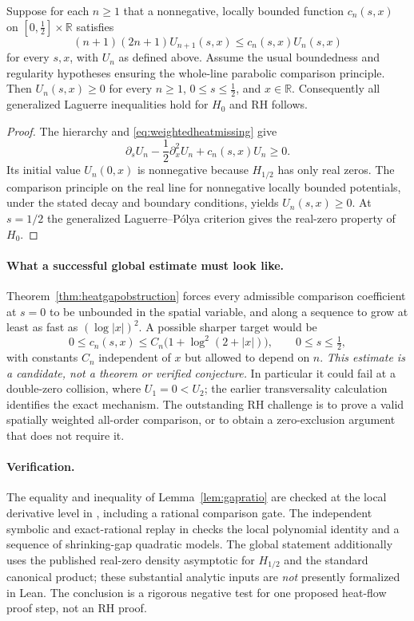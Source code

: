 \begin{proposition}
\label{prop:weightedheatsufficient}
Suppose for each $n\ge1$ that a
nonnegative, locally bounded function
$c_n(s,x)$ on $[0,\tfrac12]\times\mathbb R$
satisfies
\begin{equation}
(n+1)(2n+1)U_{n+1}(s,x)
\le c_n(s,x)U_n(s,x)
\label{eq:weightedheatmissing}
\end{equation}
for every $s,x$, with $U_n$ as
defined above. Assume the usual
boundedness and regularity hypotheses
ensuring the whole-line parabolic
comparison principle. Then
$U_n(s,x)\ge0$ for every
$n\ge1$, $0\le s\le\tfrac12$,
and $x\in\mathbb R$.
Consequently all generalized
Laguerre inequalities hold for
$H_0$ and RH follows.
\end{proposition}
\begin{proof}
The hierarchy and
\eqref{eq:weightedheatmissing} give
\[
\partial_s U_n-\frac12\partial_x^2U_n
+c_n(s,x)U_n\ge0.
\]
Its initial value $U_n(0,x)$ is
nonnegative because $H_{1/2}$ has
only real zeros. The comparison
principle on the real line for
nonnegative locally bounded potentials,
under the stated decay and boundary
conditions, yields $U_n(s,x)\ge0$.
At $s=1/2$ the generalized
Laguerre--P\'olya criterion gives
the real-zero property of $H_0$.
\end{proof}

\paragraph{What a successful global estimate must look like.}
Theorem~\ref{thm:heatgapobstruction}
forces every admissible comparison
coefficient at $s=0$ to be
unbounded in the spatial variable,
and along a sequence to grow
at least as fast as $(\log |x|)^2$.
A possible sharper target would be
\[
0\le c_n(s,x)\le
C_n\bigl(1+\log^2(2+|x|)\bigr),
\qquad 0\le s\le\tfrac12,
\]
with constants $C_n$ independent
of $x$ but allowed to depend on $n$.
\emph{This estimate is a candidate,
not a theorem or verified conjecture.}
In particular it could fail at a
double-zero collision, where
$U_1=0<U_2$; the earlier
transversality calculation identifies
the exact mechanism.
The outstanding RH challenge is to
prove a valid spatially weighted
all-order comparison, or to obtain
a zero-exclusion argument that does
not require it.

\paragraph{Verification.}
The equality and inequality of
Lemma~\ref{lem:gapratio} are checked
at the local derivative level in
,
including a rational comparison gate.
The independent symbolic and
exact-rational replay in
checks the local polynomial identity
and a sequence of shrinking-gap
quadratic models. The global
statement additionally uses the
published real-zero density
asymptotic for $H_{1/2}$
and the standard canonical product;
these substantial analytic inputs
are \emph{not} presently formalized
in Lean. The conclusion is a
rigorous negative test for one
proposed heat-flow proof step,
not an RH proof.
